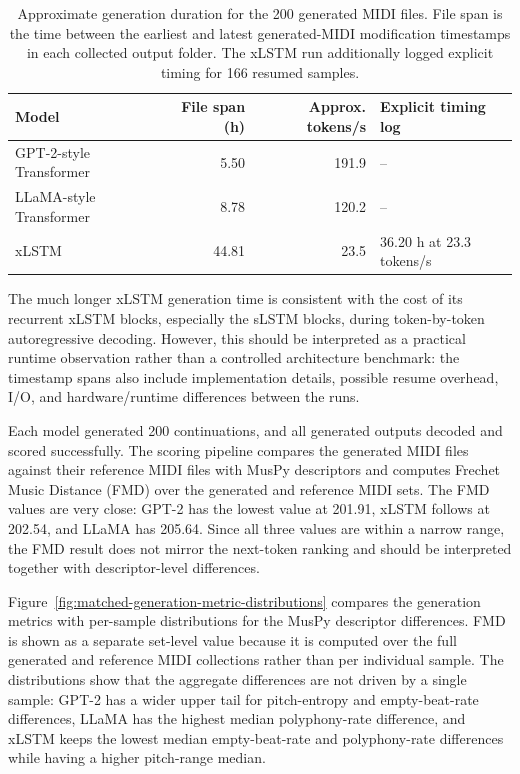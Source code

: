 \begin{table}[htbp]
	\centering
	\small
	\begin{tabular}{lrrl}
		\toprule
		Model                   & File span (h) & Approx. tokens/s & Explicit timing log      \\
		\midrule
		GPT-2-style Transformer & 5.50          & 191.9            & --                       \\
		LLaMA-style Transformer & 8.78          & 120.2            & --                       \\
		xLSTM                   & 44.81         & 23.5             & 36.20 h at 23.3 tokens/s \\
		\bottomrule
	\end{tabular}
	\caption{Approximate generation duration for the 200 generated MIDI files. File span is the time between the earliest and latest generated-MIDI modification timestamps in each collected output folder. The xLSTM run additionally logged explicit timing for 166 resumed samples.}
	\label{tab:matched-generation-timing}
\end{table}

The much longer xLSTM generation time is consistent with the cost of its
recurrent xLSTM blocks, especially the sLSTM blocks, during token-by-token
autoregressive decoding. However, this should be interpreted as a practical
runtime observation rather than a controlled architecture benchmark: the
timestamp spans also include implementation details, possible resume overhead,
I/O, and hardware/runtime differences between the runs.

Each model generated 200 continuations, and all generated outputs decoded and
scored successfully. The scoring pipeline compares the generated MIDI files
against their reference MIDI files with MusPy descriptors
\citep{dongMusPyToolkitSymbolic2020} and computes Frechet Music Distance (FMD)
\citep{retkowskiFrechetMusicDistance2025} over the generated and reference MIDI
sets. The FMD values are very close: GPT-2 has the lowest value at 201.91,
xLSTM follows at 202.54, and LLaMA has 205.64. Since all three values are within
a narrow range, the FMD result does not mirror the next-token ranking and should
be interpreted together with descriptor-level differences.

Figure~\ref{fig:matched-generation-metric-distributions} compares the generation
metrics with per-sample distributions for the MusPy descriptor differences.
FMD is shown as a separate set-level value because it is computed over the full
generated and reference MIDI collections rather than per individual sample.
The distributions show that the aggregate differences are not driven by a single
sample: GPT-2 has a wider upper tail for pitch-entropy and empty-beat-rate
differences, LLaMA has the highest median polyphony-rate difference, and xLSTM
keeps the lowest median empty-beat-rate and polyphony-rate differences while
having a higher pitch-range median.

